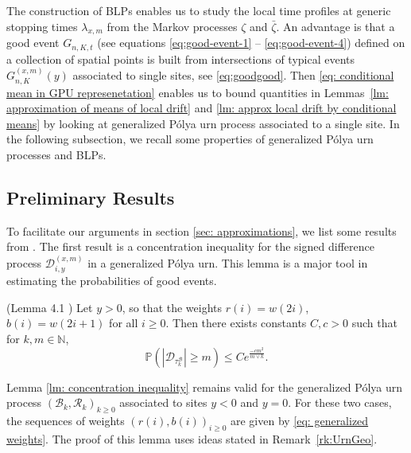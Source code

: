 \documentclass[EJP]{ejpecp} %
\newcommand{\abs}[1]{\left\vert #1 \right\vert}
\begin{document}
The construction of BLPs enables us to study the local time profiles at generic stopping times $\lambda_{x,m}$ from the Markov processes $\zeta$ and $\bar{\zeta}$. An advantage is that a good event $G_{n, K, t}$ (see equations \eqref{eq:good-event-1} -- \eqref{eq:good-event-4}) defined on a collection of spatial points is built from intersections of typical events $G_{n, K}^{(x,m)}(y)$ associated to single sites, see \eqref{eq:goodgood}. Then \eqref{eq: conditional mean in GPU represenetation} enables us to bound quantities in Lemmas~\ref{lm: approximation of means of local drift} and \ref{lm: approx local drift by conditional means} by looking at generalized P\'{o}lya urn process associated to a single site. In the following subsection, we recall some properties of generalized P\'{o}lya urn processes and BLPs.

\subsection{Preliminary Results}
To facilitate our arguments in section \ref{sec: approximations}, we list some results from \cite{KMP23,T96}. 
The first result is a concentration inequality for the signed difference process $\mathscr{D}_{i, y}^{(x,m)}$ in a generalized P\'{o}lya urn. This lemma is a major tool in estimating the probabilities of good events.
\begin{lemma}(Lemma 4.1 \cite{KMP23})\label{lm: concentration inequality}
	Let $y > 0$, so that the weights $r(i) = w(2i)$, $b(i)= w(2i+1) $ for all $i\geq 0$. Then there exists constants $C,c>0$ such that for $k, m \in \mathbb{N}$,
	\[
	\mathbb{P}\left(  \abs{ \mathscr{D}_{\tau_k^{\mathscr{B}}}   } \geq m \right) \leq C e^{\frac{-cm^2}{m \vee k}}.
	\]
\end{lemma} 
Lemma \ref{lm: concentration inequality} remains valid for the generalized P\'{o}lya urn process $(\mathscr{B}_{k},\mathscr{R}_{k})_{k \ge 0}$ associated to sites $y<0$ and $y=0$. For these two cases, the sequences of weights $(r(i),b(i))_{i\ge 0}$ are given by \eqref{eq: generalized weights}. The proof of this lemma uses ideas stated in Remark~\ref{rk:UrnGeo}.
\end{document}
